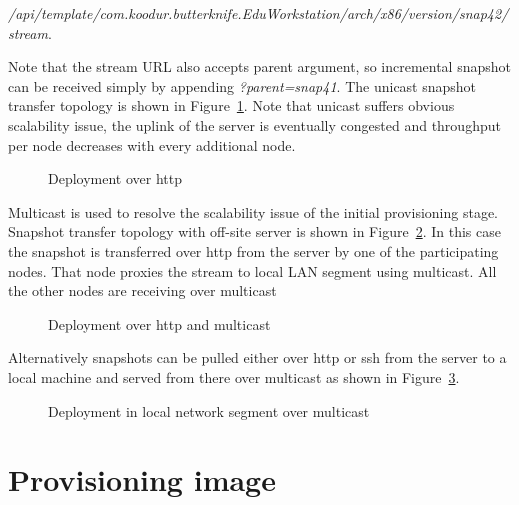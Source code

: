 \documentclass[a4paper,11pt]{kth-mag}
\begin{document}
\emph{/api/template/com.koodur.butterknife.EduWorkstation/arch/x86/version/snap42/stream}.

Note that the stream URL also accepts parent argument,
so incremental snapshot can be received simply by appending
\emph{?parent=snap41}.
The unicast snapshot transfer topology is
shown in Figure~\ref{fig:butterknife-usecase-http}.
Note that unicast suffers obvious scalability issue,
the uplink of the server is eventually congested and
throughput per node decreases with every additional node.

\begin{figure}[!htb]
\centering
\scalebox{0.5}{}
\caption{Deployment over \acrshort{http}}
\label{fig:butterknife-usecase-http}
\end{figure}

Multicast is used to resolve the scalability issue of
the initial provisioning stage.
Snapshot transfer topology with off-site
server is shown in Figure~\ref{fig:butterknife-usecase-tee}.
In this case the snapshot is transferred over \acrshort{http} from
the server by one of the participating nodes.
That node proxies the stream to local LAN segment using multicast.
All the other nodes are receiving over multicast

\begin{figure}[!htb]
\centering
\scalebox{0.5}{}
\caption{Deployment over \acrshort{http} and multicast}
\label{fig:butterknife-usecase-tee}
\end{figure}

Alternatively snapshots can be pulled either over \acrshort{http} or \acrshort{ssh} from
the server to a local machine and served from there over multicast
as shown in Figure~\ref{fig:butterknife-usecase-multicast}.

\begin{figure}[!htb]
\centering
\scalebox{0.5}{}
\caption{Deployment in local network segment over multicast}
\label{fig:butterknife-usecase-multicast}
\end{figure}



\section{Provisioning image}
\end{document}
